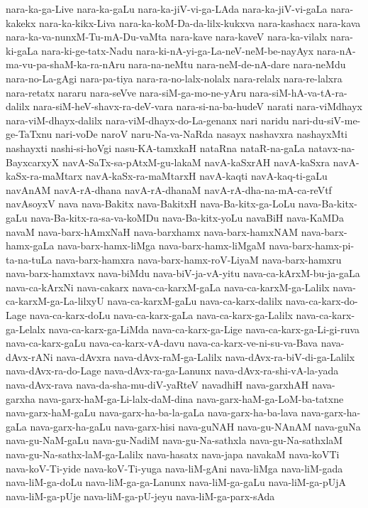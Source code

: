 {nara-ka-ga-Live
nara-ka-gaLu
nara-ka-jiV-vi-ga-LAda
nara-ka-jiV-vi-gaLa
nara-kakekx
nara-ka-kikx-Liva
nara-ka-koM-Da-da-lilx-kukxva
nara-kashacx
nara-kava
nara-ka-va-nunxM-Tu-mA-Du-vaMta
nara-kave
nara-kaveV
nara-ka-vilalx
nara-ki-gaLa
nara-ki-ge-tatx-Nadu
nara-ki-nA-yi-ga-La-neV-neM-be-nayAyx
nara-nA-ma-vu-pa-shaM-ka-ra-nAru
nara-na-neMtu
nara-neM-de-nA-dare
nara-neMdu
nara-no-La-gAgi
nara-pa-tiya
nara-ra-no-lalx-nolalx
nara-relalx
nara-re-lalxra
nara-retatx
nararu
nara-seVve
nara-siM-ga-mo-ne-yAru
nara-siM-hA-va-tA-ra-dalilx
nara-siM-heV-shavx-ra-deV-vara
nara-si-na-ba-hudeV
narati
nara-viMdhayx
nara-viM-dhayx-dalilx
nara-viM-dhayx-do-La-genanx
nari
naridu
nari-du-siV-me-ge-TaTxnu
nari-voDe
naroV
naru-Na-va-NaRda
nasayx
nashavxra
nashayxMti
nashayxti
nashi-si-hoVgi
nasu-KA-tamxkaH
nataRna
nataR-na-gaLa
natavx-na-BayxcarxyX
navA-SaTx-sa-pAtxM-gu-lakaM
navA-kaSxrAH
navA-kaSxra
navA-kaSx-ra-maMtarx
navA-kaSx-ra-maMtarxH
navA-kaqti
navA-kaq-ti-gaLu
navAnAM
navA-rA-dhana
navA-rA-dhanaM
navA-rA-dha-na-mA-ca-reVtf
navAsoyxV
nava
nava-Bakitx
nava-BakitxH
nava-Ba-kitx-ga-LoLu
nava-Ba-kitx-gaLu
nava-Ba-kitx-ra-sa-va-koMDu
nava-Ba-kitx-yoLu
navaBiH
nava-KaMDa
navaM
nava-barx-hAmxNaH
nava-barxhamx
nava-barx-hamxNAM
nava-barx-hamx-gaLa
nava-barx-hamx-liMga
nava-barx-hamx-liMgaM
nava-barx-hamx-pi-ta-na-tuLa
nava-barx-hamxra
nava-barx-hamx-roV-LiyaM
nava-barx-hamxru
nava-barx-hamxtavx
nava-biMdu
nava-biV-ja-vA-yitu
nava-ca-kArxM-bu-ja-gaLa
nava-ca-kArxNi
nava-cakarx
nava-ca-karxM-gaLa
nava-ca-karxM-ga-Lalilx
nava-ca-karxM-ga-La-lilxyU
nava-ca-karxM-gaLu
nava-ca-karx-dalilx
nava-ca-karx-do-Lage
nava-ca-karx-doLu
nava-ca-karx-gaLa
nava-ca-karx-ga-Lalilx
nava-ca-karx-ga-Lelalx
nava-ca-karx-ga-LiMda
nava-ca-karx-ga-Lige
nava-ca-karx-ga-Li-gi-ruva
nava-ca-karx-gaLu
nava-ca-karx-vA-davu
nava-ca-karx-ve-ni-su-va-Bava
nava-dAvx-rANi
nava-dAvxra
nava-dAvx-raM-ga-Lalilx
nava-dAvx-ra-biV-di-ga-Lalilx
nava-dAvx-ra-do-Lage
nava-dAvx-ra-ga-Lanunx
nava-dAvx-ra-shi-vA-la-yada
nava-dAvx-rava
nava-da-sha-mu-diV-yaRteV
navadhiH
nava-garxhAH
nava-garxha
nava-garx-haM-ga-Li-lalx-daM-dina
nava-garx-haM-ga-LoM-ba-tatxne
nava-garx-haM-gaLu
nava-garx-ha-ba-la-gaLa
nava-garx-ha-ba-lava
nava-garx-ha-gaLa
nava-garx-ha-gaLu
nava-garx-hisi
nava-guNAH
nava-gu-NAnAM
nava-guNa
nava-gu-NaM-gaLu
nava-gu-NadiM
nava-gu-Na-sathxla
nava-gu-Na-sathxlaM
nava-gu-Na-sathx-laM-ga-Lalilx
nava-hasatx
nava-japa
navakaM
nava-koVTi
nava-koV-Ti-yide
nava-koV-Ti-yuga
nava-liM-gAni
nava-liMga
nava-liM-gada
nava-liM-ga-doLu
nava-liM-ga-ga-Lanunx
nava-liM-ga-gaLu
nava-liM-ga-pUjA
nava-liM-ga-pUje
nava-liM-ga-pU-jeyu
nava-liM-ga-parx-sAda
}
